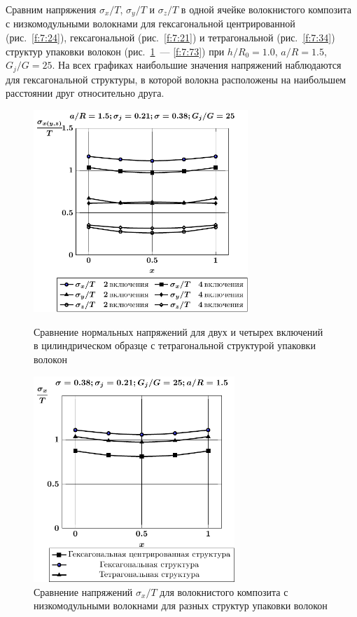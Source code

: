Сравним напряжения $\sigma_x/T$, $\sigma_y/T$ и $\sigma_z/T$ в одной ячейке волокнистого композита с низкомодульными волокнами для гексагональной центрированной (рис.~\ref{f:7:24}), гексагональной (рис.~\ref{f:7:21}) и тетрагональной (рис.~\ref{f:7:34}) структур упаковки волокон (рис.~\ref{f:7:71}~--- \ref{f:7:73}) при $h/R_0=1.0$, $a/R=1.5$, $G_j/G=25$. На всех графиках наибольшие значения напряжений наблюдаются для гексагональной структуры, в которой волокна расположены на наибольшем расстоянии друг относительно друга. 

\begin{figure}[h!]
\centering\footnotesize
\parbox[b]{7.5cm}{\centering\includegraphics[width=8.1cm]{inc4-2.pdf}
\caption{Сравнение нормальных напряжений для двух и четырех включений в цилиндрическом образце с тетрагональной структурой упаковки волокон
\label{f:7:70}}}\hfil\hfil
\parbox[b]{7.5cm}{\centering\includegraphics[width=7.6cm]{inc7-6-4-sig_x.pdf}
\caption{Сравнение напряжений $\sigma_x/T$ для волокнистого композита с низкомодульными волокнами для разных структур упаковки волокон
\label{f:7:71}}}
\end{figure}

